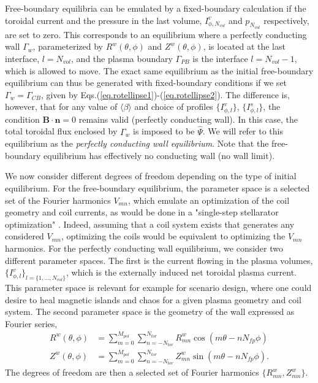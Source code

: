 Free-boundary equilibria can be emulated by a fixed-boundary calculation if the toroidal current and the pressure in the last volume, $I^v_{\phi,N_{vol}}$ and $p_{N_{vol}}$ respectively, are set to zero. This corresponds to an equilibrium where a perfectly conducting wall $\Gamma_w$, parameterized by $R^w(\theta,\phi)$ and $Z^w(\theta,\phi)$, is located at the last interface, $l=N_{vol}$, and the plasma boundary $\Gamma_{PB}$ is the interface $l=N_{vol}-1$, which is allowed to move. The exact same equilibrium as the initial free-boundary equilibrium can thus be generated with fixed-boundary conditions if we set $\Gamma_w=\Gamma_{CB}$, given by Eqs.(\ref{eq.rotellipse1})-(\ref{eq.rotellipse2}). The difference is, however, that for any value of $\langle\beta\rangle$ and choice of  profiles $\{I^v_{\phi,l}\}$, $\{I^s_{\phi,l}\}$, the condition $\mathbf{B}\cdot\mathbf{n}=0$ remains valid (perfectly conducting wall). In this case, the total toroidal flux enclosed by $\Gamma_w$ is imposed to be $\widehat\Psi$. We will refer to this equilibrium as the \emph{perfectly conducting wall equilibrium}. Note that the free-boundary equilibrium has effectively no conducting wall (no wall limit).

We now consider different degrees of freedom depending on the type of initial equilibrium. 
For the free-boundary equilibrium, the parameter space is a selected set of the Fourier harmonics $V_{mn}$, which emulate an optimization of the coil geometry and coil currents, as would be done in a "single-step stellarator optimization" \cite{Hudson2002,Henneberg2021c}. Indeed, assuming that a coil system exists that generates any considered $V_{mn}$, optimizing the coils would be equivalent to optimizing the $V_{mn}$ harmonics.
For the perfectly conducting wall equilibrium, we consider two different parameter spaces. The first is the current flowing in the plasma volumes, $\{I^v_{\phi,l}\}_{l=\{1,\ldots,N_{vol}\}}$, which is the externally induced net toroidal plasma current. This parameter space is relevant for example for scenario design, where one could desire to heal magnetic islands and chaos for a given plasma geometry and coil system.  
The second parameter space is the geometry of the wall expressed as Fourier series,
\begin{align}
    R^w(\theta,\phi) &= \sum_{m=0}^{M_{pol}}\sum_{n=-N_{tor}}^{N_{tor}}R^w_{mn} \cos(m\theta-n N_{fp}\phi)\\
    Z^w(\theta,\phi) &= \sum_{m=0}^{M_{pol}}\sum_{n=-N_{tor}}^{N_{tor}}Z^w_{mn} \sin(m\theta-n N_{fp}\phi).
\end{align}
The degrees of freedom are then a selected set of Fourier harmonics $\{R^w_{mn},Z^w_{mn}\}$.


